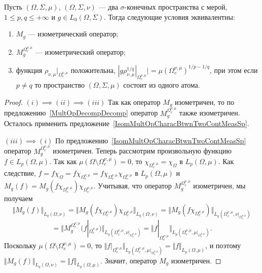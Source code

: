 \begin{proposition}\label{IsomMultOpCharacBtwnTwoMeasSp} Пусть
$(\Omega,\Sigma,\mu)$, $(\Omega,\Sigma,\nu)$ --- два $\sigma$-конечных
пространства с мерой, $1\leq p,q\leq +\infty$ и $g\in L_0(\Omega,\Sigma)$. Тогда
следующие условия эквивалентны:

\begin{enumerate}[label = (\roman*)]
    \item $M_g$ --- изометрический оператор;

    \item $M_g^{\Omega_c^{\nu,\mu}}$ --- изометрический оператор;

    \item функция $\rho_{\nu,\mu}|_{\Omega_c^{\nu,\mu}}$ положительна, 
    $|g \rho_{\nu,\mu}^{1/q}|_{\Omega_c^{\nu,\mu}}|
    ={\mu(\Omega_c^{\nu,\mu})}^{1/p-1/q}$, при этом если $p\neq q$ 
    то пространство $(\Omega,\Sigma,\mu)$ состоит из одного атома.
\end{enumerate}
\end{proposition}
\begin{proof} $(i) \implies (ii) \implies (iii)$ Так как оператор $M_g$
изометричен, то по предложению~\ref{MultOpDecompDecomp} оператор
$M_g^{\Omega_c^{\nu,\mu}}$ также изометричен. Осталось применить
предложение~\ref{IsomMultOpCharacBtwnTwoContMeasSp}.

$(iii) \implies (i)$ По предложению~\ref{IsomMultOpCharacBtwnTwoContMeasSp}
оператор $M_g^{\Omega_c^{\nu,\mu}}$ изометричен. Теперь рассмотрим произвольную
функцию $f\in L_p(\Omega,\mu)$. Так как
$\mu(\Omega\setminus\Omega_c^{\nu,\mu})=0$, то
$\chi_{\Omega_c^{\nu,\mu}}=\chi_{\Omega}$ в $L_p(\Omega,\mu)$. Как следствие,
$f=f\chi_{\Omega}=f\chi_{\Omega_c^{\nu,\mu}}
=f\chi_{\Omega_c^{\nu,\mu}}\chi_{\Omega_c^{\nu,\mu}}$
в $L_p(\Omega,\mu)$ и
$M_g(f)=M_g(f\chi_{\Omega_c^{\nu,\mu}})\chi_{\Omega_c^{\nu,\mu}}$. Учитывая, что
оператор $M_g^{\Omega_c^{\nu,\mu}}$ изометричен, мы получаем
$$
\Vert M_g(f)\Vert_{L_q(\Omega,\nu)}
=\Vert 
    M_g(f\chi_{\Omega_c^{\nu,\mu}})\chi_{\Omega_c^{\nu,\mu}}
\Vert_{L_q(\Omega,\nu)}
=\Vert 
    M_g(f\chi_{\Omega_c^{\nu,\mu}})
\Vert_{L_q(\Omega_c^{\nu,\mu},\nu|_{\Omega_c^{\nu,\mu}})}
$$
$$
=\Vert 
    M_g^{\Omega_c^{\nu,\mu}}(f|_{\Omega_c^{\nu,\mu}})
\Vert_{L_q(\Omega_c^{\nu,\mu},\nu|_{\Omega_c^{\nu,\mu}})}
=\Vert 
    f|_{\Omega_c^{\nu,\mu}}
\Vert_{L_p(\Omega_c^{\nu,\mu},\mu|_{\Omega_c^{\nu,\mu}})}.
$$
Поскольку $\mu(\Omega\setminus\Omega_c^{\nu,\mu})=0$, то 
$\Vert 
    f|_{\Omega_c^{\nu,\mu}}
\Vert_{L_p(\Omega_c^{\nu,\mu},\mu|_{\Omega_c^{\nu,\mu}})}
=\Vert f\Vert_{L_p(\Omega,\mu)}$, и поэтому 
$\Vert M_g(f)\Vert_{L_q(\Omega,\nu)}=\Vert f\Vert_{L_p(\Omega,\mu)}$. 
Значит, оператор $M_g$ изометричен.
\end{proof}

